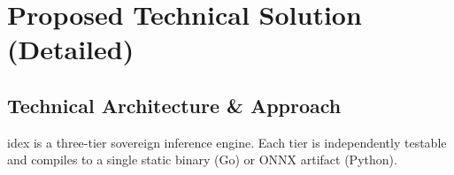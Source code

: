 \documentclass[11pt,a4paper]{article}
\begin{document}
\pagebreak

\section{Proposed Technical Solution (Detailed)}

\subsection{Technical Architecture \& Approach}

idex is a three-tier sovereign inference engine. Each tier is independently
testable and compiles to a single static binary (Go) or ONNX artifact (Python).
\end{document}
